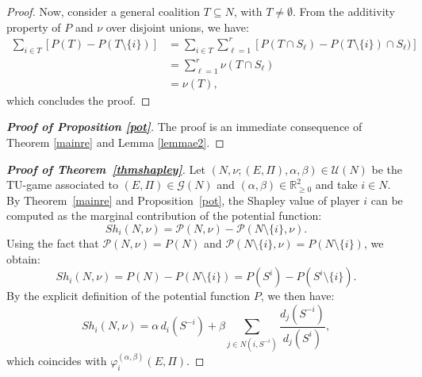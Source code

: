 \documentclass[preprint,11pt,authoryear]{elsarticle}
\theoremstyle{plain}
\begin{document}
\begin{proof}
	Now, consider a general coalition \( T \subseteq N \), with \( T \neq \emptyset \). From the additivity property of $P$ and  \(\nu \) over disjoint unions, we have:
	\begin{equation}
		\label{lemma203}
		\begin{aligned}
			\sum_{i \in T} \left[ P(T) - P(T \setminus \{i\}) \right]
			&= \sum_{i \in T} \sum_{\ell=1}^{r} \left[ P(T \cap S_\ell) - P(T \setminus \{i\}) \cap S_\ell) \right] \\
			&= \sum_{\ell = 1}^{r} \nu(T \cap S_\ell) \\
			&= \nu(T),
		\end{aligned}
	\end{equation}
	which concludes the proof.
\end{proof}


\begin{proof}[\bf Proof of Proposition \ref{pot}]
	The proof is an immediate consequence of  Theorem \ref{mainre}  
	and  Lemma \ref{lemmae2}. 
\end{proof}

\begin{proof}[\bf Proof of Theorem~\ref{thmshapley}]
	Let \( (N, \nu; (E, \Pi), \alpha, \beta) \in \mathcal{U}(N) \) be the TU-game associated to $(E, \Pi)\in\mathcal{G}(N)$ and $(\alpha, \beta)\in\mathbb{R}_{\geq0}^2$ and take \( i \in N \). By Theorem~\ref{mainre} and Proposition~\ref{pot}, the Shapley value of player \( i \) can be computed as the marginal contribution of the potential function:
	\[
	Sh_i(N, \nu) = \mathcal{P}(N, \nu) - \mathcal{P}(N \setminus \{i\}, \nu).
	\]
	Using the fact that \( \mathcal{P}(N, \nu) = P(N) \) and \( \mathcal{P}(N \setminus \{i\}, \nu) = P(N \setminus \{i\}) \), we obtain:
	\[
	Sh_i(N, \nu) = P(N) - P(N \setminus \{i\}) = P(S^i) - P(S^i \setminus \{i\}).
	\]
	By the explicit definition of the potential function \( P \), we then have:
	\[
	Sh_i(N, \nu) = \alpha \, d_i(S^{-i}) + \beta \sum_{j \in N(i, S^{-i})} \frac{d_j(S^{-i})}{d_j(S^i)},
	\]
	which coincides with \( \varphi_i^{(\alpha,\beta)}(E,\Pi)\). 
\end{proof}
\end{document}
